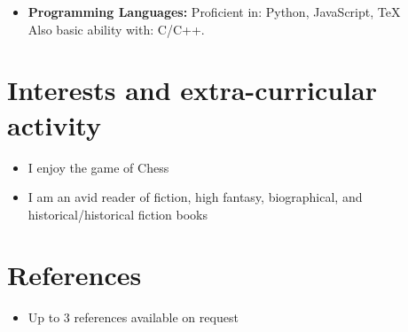\documentclass[11pt,a4paper,sans]{moderncv}        %
\begin{document}
\vspace{6pt}

\begin{itemize}

\item \textbf{Programming Languages:} Proficient in: Python, JavaScript, \TeX \\ Also basic ability with: C/C++.

\vspace{6pt}



\end{itemize}

\section{Interests and extra-curricular activity}

\vspace{6pt}

\begin{itemize}

\item{I enjoy the game of Chess}

\vspace{6pt}

\item{I am an avid reader of fiction, high fantasy, biographical, and historical/historical fiction books}

\end{itemize}

\section{References}

\vspace{6pt}
 
\begin{itemize}

\item{Up to 3 references available on request}

\end{itemize}

\nocite{*}

\end{document}
